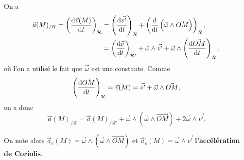             On a 
            \begin{align*}
                \vec{a}(M)_{/\mathcal{R}}=\left(\frac{\mathrm{d}\vec{v}(M)}{\mathrm{d} t}\right)_{\mathcal{R}}
                &=\left(\frac{\mathrm{d}\vec{v'}}{\mathrm{d} t}\right)_{\mathcal{R}}+\left(\frac{\mathrm{d}}{\mathrm{d} t}\left(\vec{\omega}\wedge\vec{OM}\right)\right)_{\mathcal{R}},\\
                &=\left(\frac{\mathrm{d}\vec{v}}{\mathrm{d} t}\right)_{\mathcal{R}'}+\vec{\omega}\wedge\vec{v'}+\vec{\omega}\wedge\left(\frac{\mathrm{d}\vec{OM}}{\mathrm{d} t}\right)_{\mathcal{R}},
            \end{align*}
            où l'on a utilisé le fait que $\vec{\omega}$ est une constante. Comme 
            \begin{equation*}
                \left(\dfrac{\mathrm{d}\vec{OM}}{\mathrm{d} t}\right)_{\mathcal{R}}=\vec{v}(M)=\vec{v'}+\vec{\omega}\wedge\vec{OM},
            \end{equation*}
            on a donc 
            \begin{equation*}
                \boxed{
                    \vec{a}(M)_{/\mathcal{R}}=\vec{a}(M)_{/\mathcal{R}'}+\vec{\omega}\wedge\left(\vec{\omega}\wedge\vec{OM}\right)+2\vec{\omega}\wedge\vec{v'}.
                }
            \end{equation*}

            On note alors $\vec{a}_e(M)=\vec{\omega}\wedge\left(\vec{\omega}\wedge\vec{OM}\right)$ et $\vec{a}_c(M)=\vec{\omega}\wedge\vec{v'}$ \textbf{l'accélération de Coriolis}.

